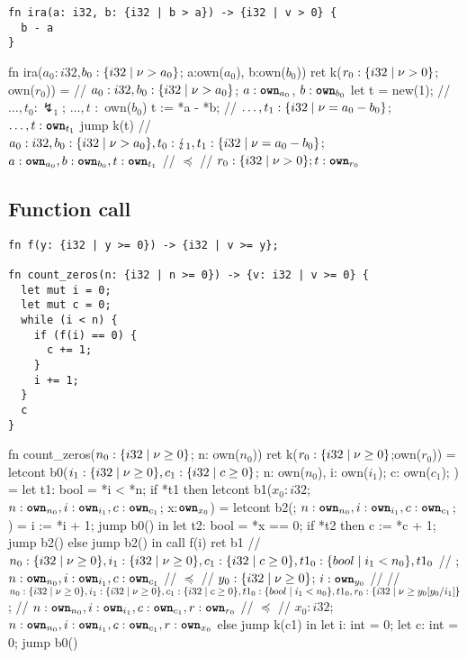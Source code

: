 \documentclass{article}
\begin{document}
\begin{verbatim}
fn ira(a: i32, b: {i32 | b > a}) -> {i32 | v > 0} {
  b - a
}
\end{verbatim}

\begin{lambdalr}
fn ira($a_0: i32$,$b_0:\r{i32|\nu>a_0}$; a:own($a_0$), b:own($b_0$)) ret k($r_0:\r{i32 | \nu>0}$; own($r_0$)) =
  // $a_0: i32,b_0:\r{i32 | \nu > a_0}$; $a : \text{\ttfamily \bfseries own}_{a_0}$, $b : \text{\ttfamily \bfseries own}_{b_0}$
  let t = new(1);  // $\dots,t_0: \lightning_1$; $\dots,t$ $:$ own($b_0$)
  t := *a - *b;    // $\dots,t_1: \r{i32 | \nu = a_0 - b_0}$; $\dots,t : \text{\ttfamily \bfseries own}_{t_1}$
  jump k(t) // $a_0: i32, b_0: \r{i32 | \nu > a_0}, t_0: \lightning_1,t_1: \r{i32 | \nu = a_0 - b_0}$;$a: \text{\ttfamily \bfseries own}_{a_0}, b: \text{\ttfamily \bfseries own}_{b_0}, t: \text{\ttfamily \bfseries own}_{t_1}$
            // $\preceq$
            // $r_0:\r{i32 | \nu > 0}; t:\own{r_0}$
\end{lambdalr}

\subsection{Function call}

\begin{verbatim}
fn f(y: {i32 | y >= 0}) -> {i32 | v >= y};

fn count_zeros(n: {i32 | n >= 0}) -> {v: i32 | v >= 0} {
  let mut i = 0;
  let mut c = 0;
  while (i < n) {
    if (f(i) == 0) {
      c += 1;
    }
    i += 1;
  }
  c
}
\end{verbatim}

\begin{lambdalr}
fn count_zeros($n_0: \r{i32|\nu \geq 0}$; n: own($n_0$)) ret k($r_0: \r{i32 | \nu \geq 0}$;own($r_0$)) =
  letcont b0($i_1: \r{i32| \nu \geq 0}, c_1: \r{i32 | c \geq 0}$; n: own($n_0$), i: own($i_1$); c: own($c_1$); ) =
    let t1: bool = *i < *n;
    if *t1 then
      letcont b1($x_0: i32$; $n:\text{\ttfamily \bfseries own}_{n_0}, i:\text{\ttfamily \bfseries own}_{i_1}, c:\text{\ttfamily \bfseries own}_{c_1}$; x:$\text{\ttfamily \bfseries own}_{x_0}$) =
        letcont b2(; $n:\text{\ttfamily \bfseries own}_{n_0}, i:\text{\ttfamily \bfseries own}_{i_1}, c:\text{\ttfamily \bfseries own}_{c_1}$; ) =
          i := *i + 1;
          jump b0()
        in
        let t2: bool = *x == 0;
        if *t2 then
          c := *c + 1;
          jump b2()
        else
          jump b2()
      in
      call f(i) ret b1
        // $n_0:\r{i32|\nu\geq 0}, i_1:\r{i32|\nu\geq 0}, c_1:\r{i32|c\geq 0},t1_0:\r{bool|i_1<n_0},t1_0$
        // ;$n:\text{\ttfamily \bfseries own}_{n_0},i:\text{\ttfamily \bfseries own}_{i_1},c:\text{\ttfamily \bfseries own}_{c_1}$
        // $\preceq$
        // $y_0: \r{i32 | \nu\geq 0}$; $i:\text{\ttfamily \bfseries own}_{y_0}$
        //
        // $n_0:\r{i32|\nu\geq 0}, i_1:\r{i32|\nu\geq 0}, c_1:\r{i32|c\geq 0},t1_0:\r{bool|i_1<n_0},t1_0,r_0:\r{i32|\nu\geq y_0[y_0/i_1]}$;
        // $n:\text{\ttfamily \bfseries own}_{n_0},i:\text{\ttfamily \bfseries own}_{i_1},c:\text{\ttfamily \bfseries own}_{c_1}, r:\text{\ttfamily \bfseries own}_{r_0}$
        // $\preceq$
        // $x_0: i32$; $n: \text{\ttfamily \bfseries own}_{n_0}, i:\text{\ttfamily \bfseries own}_{i_1}, c:\text{\ttfamily \bfseries own}_{c_1}, r:\text{\ttfamily \bfseries own}_{x_0}$
    else
      jump k(c1)
  in
  let i: int = 0;
  let c: int = 0;
  jump b0()
\end{lambdalr}
\end{document}
